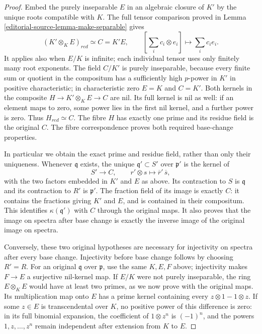 \begin{proof}
Embed the purely inseparable $E$
in an algebraic closure of $K'$
by the unique roots compatible
with $K$. The full tensor comparison
proved in Lemma \ref{editorial-source-lemma-make-separable}
gives
$$
(K'\otimes_K E)_{red}\simeq C=K'E,
\qquad [\sum_i c_i\otimes e_i]
\longmapsto\sum_i c_i e_i.
$$
It applies also when $E/K$ is
infinite; each individual tensor
uses only finitely many root
exponents. The field $C/K'$ is
purely inseparable, because every
finite sum or quotient in the
compositum has a sufficiently high
$p$-power in $K'$ in positive
characteristic; in characteristic
zero $E=K$ and $C=K'$.
Both kernels in the composite
$H\to K'\otimes_K E\to C$ are nil.
Its full kernel is nil as well:
if an element maps to zero, some
power lies in the first nil kernel,
and a further power is zero.
Thus $H_{red}\simeq C$. The fibre
$H$ has exactly one prime and its
residue field is the original $C$.
The fibre correspondence proves
both required base-change properties.

In particular we obtain the exact
prime and residue field, rather
than only their uniqueness. Whenever
$\mathfrak q$ exists, the unique
$\mathfrak q'\subset S'$ over
$\mathfrak p'$ is the kernel of
$$
S'\longrightarrow C,\qquad
r'\otimes s\longmapsto
\overline r'\,\overline s,
$$
with the two factors embedded in
$K'$ and $E$ as above. Its contraction
to $S$ is $\mathfrak q$ and its
contraction to $R'$ is $\mathfrak p'$.
The fraction field of its image
is exactly $C$: it contains the
fractions giving $K'$ and $E$,
and is contained in their compositum.
This identifies $\kappa(\mathfrak q')$
with $C$ through the original maps.
It also proves that the image on
spectra after base change is exactly
the inverse image of the original
image on spectra.

Conversely, these two original
hypotheses are necessary for
injectivity on spectra after every
base change. Injectivity before
base change follows by choosing
$R'=R$. For an original
$\mathfrak q$ over $\mathfrak p$,
use the same $K,E,F$ above; injectivity
makes $F\to E$ a surjective nil-kernel
map. If $E/K$ were not purely
inseparable, the ring $E\otimes_K E$
would have at least two primes, as
we now prove with the original maps.
Its multiplication map onto $E$
has a prime kernel containing every
$z\otimes1-1\otimes z$.
If some $z\in E$ is transcendental
over $K$, no positive power of
this difference is zero: in its
full binomial expansion, the
coefficient of $1\otimes z^n$
is $(-1)^n$, and the powers
$1,z,\ldots,z^n$ remain independent
after extension from $K$ to $E$.


\end{proof}
